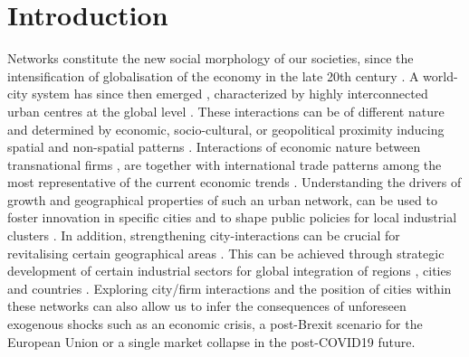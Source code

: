 \documentclass[10pt,letterpaper]{article}
\begin{document}
\linenumbers



\section*{Introduction}

Networks constitute the new social morphology of our societies, since the intensification of globalisation of the economy in the late 20th century \cite{castells2000networksociety}. A world-city system has since then emerged \cite{taylor2001specification}, characterized by highly interconnected urban centres at the global level \cite{sassen1991}. These interactions can be of different nature and determined by economic, socio-cultural, or geopolitical proximity inducing spatial and non-spatial patterns \cite{martinus2018global}. Interactions of economic nature between transnational firms \cite{derudder2018central}, are together with international trade patterns among the most representative of the current economic trends \cite{taylor2001specification}. Understanding the drivers of growth and geographical properties of such an urban network, can be used to foster innovation in specific cities and to shape public policies for local industrial clusters \cite{turkina2016structure}. In addition, strengthening city-interactions can be crucial for revitalising certain geographical areas \cite{Clarke2018}. This can be achieved through strategic development of certain industrial sectors for global integration of regions \cite{dawley2019creating}, cities \cite{gluckler2016relational} and countries \cite{martinus2019brokerage}. Exploring city/firm interactions \cite{storme2019introducing} and the position of cities within these networks \cite{gluckler2016relational} can also allow us to infer the consequences of unforeseen exogenous shocks such as an economic crisis, a post-Brexit scenario for the European Union or a single market collapse in the post-COVID19 future.
\end{document}

